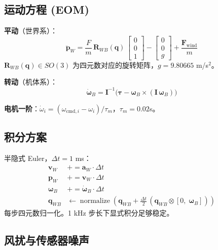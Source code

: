 \documentclass[12pt,a4paper]{article}
\begin{document}
\subsection{运动方程 (EOM)}

\textbf{平动}（世界系）：
\begin{equation}
  \ddot{\mathbf{p}}_W = \frac{F}{m}\,\mathbf{R}_{WB}(\mathbf{q})\,
    \begin{bmatrix}0\\0\\1\end{bmatrix}
    - \begin{bmatrix}0\\0\\g\end{bmatrix}
    + \frac{\mathbf{F}_{\text{wind}}}{m}
  \label{eq:translation}
\end{equation}
$\mathbf{R}_{WB}(\mathbf{q}) \in SO(3)$ 为四元数对应的旋转矩阵，$g=9.80665$ m/s$^2$。

\textbf{转动}（机体系）：
\begin{equation}
  \dot{\boldsymbol{\omega}}_B = \mathbf{I}^{-1}\bigl(\boldsymbol{\tau}
    - \boldsymbol{\omega}_B \times (\mathbf{I}\,\boldsymbol{\omega}_B)\bigr)
  \label{eq:rotation}
\end{equation}

\textbf{电机一阶}：$\dot{\omega}_i = (\omega_{\text{cmd},i} - \omega_i)/\tau_m$，$\tau_m = 0.02$s。

\subsection{积分方案}

半隐式 Euler，$\Delta t = 1$ ms：
\begin{align}
  \mathbf{v}_W &\mathrel{+}= \mathbf{a}_W \cdot \Delta t \nonumber\\
  \mathbf{p}_W &\mathrel{+}= \mathbf{v}_W \cdot \Delta t \nonumber\\
  \boldsymbol{\omega}_B &\mathrel{+}= \dot{\boldsymbol{\omega}}_B \cdot \Delta t \nonumber\\
  \mathbf{q}_{WB} &\leftarrow \operatorname{normalize}\!\left(
    \mathbf{q}_{WB} + \tfrac{\Delta t}{2}\,(\mathbf{q}_{WB} \otimes [0,\; \boldsymbol{\omega}_B])\right)
  \label{eq:quat-int}
\end{align}
每步四元数归一化。1 kHz 步长下显式积分足够稳定。

\subsection{风扰与传感器噪声}
\end{document}
